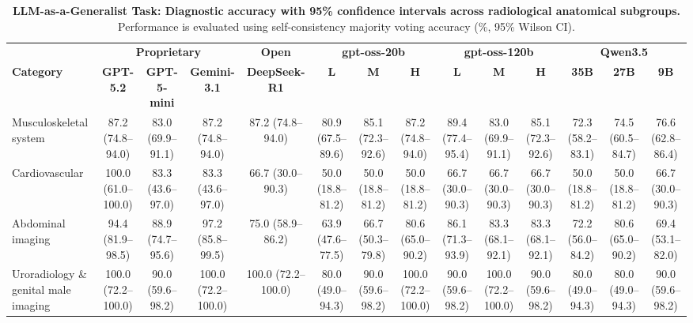 \documentclass[10pt,journal,compsoc, onecolumn]{IEEEtran}
\begin{document}
\vspace*{\fill}
\clearpage



\begin{table}
\centering
\tiny
\setlength{\tabcolsep}{2pt}
\caption{\textbf{LLM-as-a-Generalist Task: Diagnostic accuracy with 95\% confidence intervals across radiological anatomical subgroups.}
Performance is evaluated using self-consistency majority voting accuracy (\%, 95\% Wilson CI).}
\label{tab:generalist_full_ci}
\begin{tabular}{l *{13}{c}}
\toprule
& \multicolumn{3}{c}{\textbf{Proprietary}} & \textbf{Open} & \multicolumn{3}{c}{\textbf{gpt-oss-20b}} & \multicolumn{3}{c}{\textbf{gpt-oss-120b}} & \multicolumn{3}{c}{\textbf{Qwen3.5}} \\
\cmidrule(lr){2-4} \cmidrule(lr){5-5} \cmidrule(lr){6-8} \cmidrule(lr){9-11} \cmidrule(lr){12-14}
\textbf{Category} &
\textbf{GPT-5.2} &
\textbf{GPT-5-mini} &
\textbf{Gemini-3.1} &
\textbf{DeepSeek-R1} &
\textbf{L} & \textbf{M} & \textbf{H} &
\textbf{L} & \textbf{M} & \textbf{H} &
\textbf{35B} & \textbf{27B} & \textbf{9B} \\
\midrule
Musculoskeletal system        & 87.2 (74.8--94.0) & 83.0 (69.9--91.1) & 87.2 (74.8--94.0) & 87.2 (74.8--94.0) & 80.9 (67.5--89.6) & 85.1 (72.3--92.6) & 87.2 (74.8--94.0) & 89.4 (77.4--95.4) & 83.0 (69.9--91.1) & 85.1 (72.3--92.6) & 72.3 (58.2--83.1) & 74.5 (60.5--84.7) & 76.6 (62.8--86.4) \\
Cardiovascular                & 100.0 (61.0--100.0) & 83.3 (43.6--97.0) & 83.3 (43.6--97.0) & 66.7 (30.0--90.3) & 50.0 (18.8--81.2) & 50.0 (18.8--81.2) & 50.0 (18.8--81.2) & 66.7 (30.0--90.3) & 66.7 (30.0--90.3) & 66.7 (30.0--90.3) & 50.0 (18.8--81.2) & 50.0 (18.8--81.2) & 66.7 (30.0--90.3) \\
Abdominal imaging             & 94.4 (81.9--98.5) & 88.9 (74.7--95.6) & 97.2 (85.8--99.5) & 75.0 (58.9--86.2) & 63.9 (47.6--77.5) & 66.7 (50.3--79.8) & 80.6 (65.0--90.2) & 86.1 (71.3--93.9) & 83.3 (68.1--92.1) & 83.3 (68.1--92.1) & 72.2 (56.0--84.2) & 80.6 (65.0--90.2) & 69.4 (53.1--82.0) \\
Uroradiology \& genital male imaging
                              & 100.0 (72.2--100.0) & 90.0 (59.6--98.2) & 100.0 (72.2--100.0) & 100.0 (72.2--100.0) & 80.0 (49.0--94.3) & 90.0 (59.6--98.2) & 100.0 (72.2--100.0) & 90.0 (59.6--98.2) & 100.0 (72.2--100.0) & 90.0 (59.6--98.2) & 80.0 (49.0--94.3) & 80.0 (49.0--94.3) & 90.0 (59.6--98.2) \\

\end{tabular}
\end{table}
\end{document}
